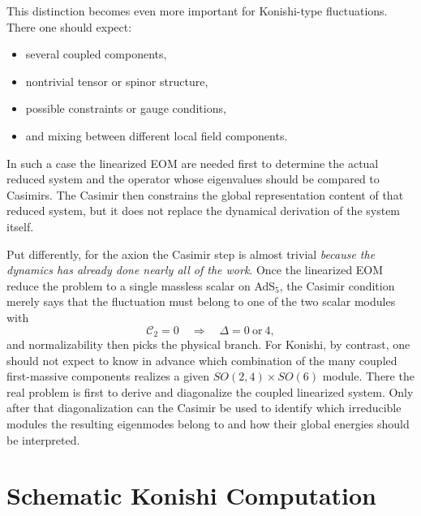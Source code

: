 \documentclass[12pt]{article}
\newcommand{\D}{\Delta}
\newcommand{\cC}{\mathcal{C}}
\begin{document}
This distinction becomes even more important for Konishi-type fluctuations.  There one should expect:
\begin{itemize}
\item several coupled components,
\item nontrivial tensor or spinor structure,
\item possible constraints or gauge conditions,
\item and mixing between different local field components.
\end{itemize}
In such a case the linearized EOM are needed first to determine the actual reduced system and the operator
whose eigenvalues should be compared to Casimirs.  The Casimir then constrains the global representation
content of that reduced system, but it does not replace the dynamical derivation of the system itself.

Put differently, for the axion the Casimir step is almost trivial \emph{because the dynamics has already
done nearly all of the work}.  Once the linearized EOM reduce the problem to a single massless scalar on
AdS$_5$, the Casimir condition merely says that the fluctuation must belong to one of the two scalar
modules with
\begin{equation}
\cC_2=0 \quad \Longrightarrow \quad \D=0 \ \text{or}\ 4,
\end{equation}
and normalizability then picks the physical branch.  For Konishi, by contrast, one should not expect to
know in advance which combination of the many coupled first-massive components realizes a given
$SO(2,4)\times SO(6)$ module.  There the real problem is first to derive and diagonalize the coupled
linearized system.  Only after that diagonalization can the Casimir be used to identify which irreducible
modules the resulting eigenmodes belong to and how their global energies should be interpreted.

\section{Schematic Konishi Computation}
\end{document}
